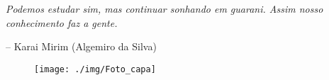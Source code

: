 
\vspace*{\fill}

\epigraph{\emph{Podemos estudar sim, mas continuar sonhando em guarani. Assim nosso conhecimento faz a gente.}}{-- Karai Mirim (Algemiro da Silva)}

\thispagestyle{empty}

\pagebreak

\vspace*{\fill}

\begin{figure}[H]
\centering
  \texttt{[image: ./img/Foto\_capa]}
\end{figure}

\vspace*{\fill}

\thispagestyle{empty}